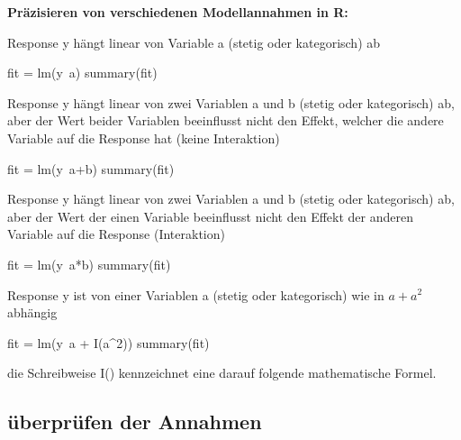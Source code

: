 \documentclass[a4paper,twoside]{tufte-book}\usepackage[]{graphicx}\usepackage[]{color}
\begin{document}
\vspace{1cm}
\begin{fullwidth}
\begin{mdframed}
    
\textbf{Präzisieren von verschiedenen Modellannahmen in R:} 

Response y hängt linear von Variable a (stetig oder kategorisch) ab

\begin{Schunk}
\begin{Sinput}
fit = lm(y~a)
summary(fit)
\end{Sinput}
\end{Schunk}

Response y hängt linear von zwei Variablen a und b (stetig oder kategorisch) ab, aber der Wert beider Variablen beeinflusst nicht den Effekt, welcher die andere Variable auf die Response hat (keine Interaktion)

\begin{Schunk}
\begin{Sinput}
fit = lm(y~a+b)
summary(fit)
\end{Sinput}
\end{Schunk}

Response y hängt linear von zwei Variablen a und b (stetig oder kategorisch) ab, aber der Wert der einen Variable beeinflusst nicht den Effekt der anderen Variable auf die Response (Interaktion)

\begin{Schunk}
\begin{Sinput}
fit = lm(y~a*b)
summary(fit)
\end{Sinput}
\end{Schunk}

Response y ist von einer Variablen a (stetig oder kategorisch) wie in $a + a^2$ abhängig

\begin{Schunk}
\begin{Sinput}
fit = lm(y~a + I(a^2))
summary(fit)
\end{Sinput}
\end{Schunk}

die Schreibweise I() kennzeichnet eine darauf folgende mathematische Formel. 

\end{mdframed}
\end{fullwidth}



\subsection{überprüfen der Annahmen}
\end{document}
